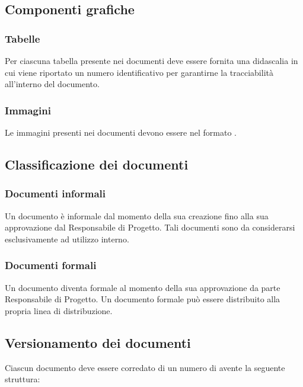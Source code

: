 \subsection{Componenti grafiche}
\subsubsection{Tabelle}
Per ciascuna tabella presente nei documenti deve essere fornita una didascalia in cui viene riportato un numero identificativo per garantirne la tracciabilità all'interno del documento.

\subsubsection{Immagini}
Le immagini presenti nei documenti devono essere nel formato .


\subsection{Classificazione dei documenti}
\subsubsection{Documenti informali}
Un documento è informale dal momento della sua creazione fino alla sua approvazione dal Responsabile di Progetto. Tali documenti sono da considerarsi esclusivamente ad utilizzo interno.
\subsubsection{Documenti formali}
Un documento diventa formale al momento della sua approvazione da parte Responsabile di Progetto. Un documento formale pu\`o essere distribuito alla propria linea di distribuzione.

\subsection{Versionamento dei documenti}
Ciascun documento deve essere corredato di un numero di  avente la seguente struttura:

